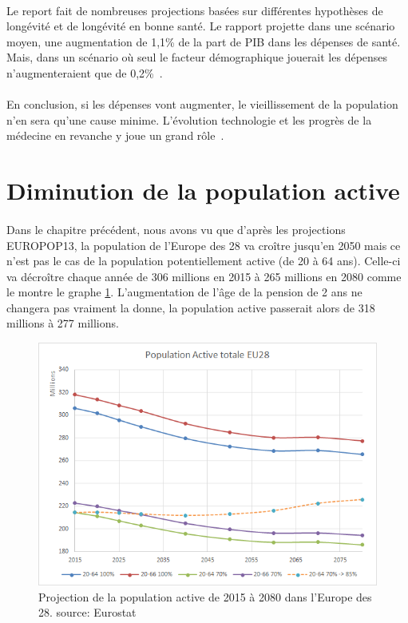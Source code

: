 \paragraph{}Le report fait de nombreuses projections basées sur différentes hypothèses de longévité et de longévité en bonne santé.  Le rapport projette dans une scénario moyen, une augmentation de 1,1\% de la part de PIB dans les dépenses de santé. Mais, dans un scénario où seul le facteur démographique jouerait les dépenses n’augmenteraient que de 0,2\%~\citep[pp.18]{ageing}. 

\paragraph{}En conclusion, si les dépenses vont augmenter, le vieillissement de la population n’en sera qu’une cause minime. L’évolution technologie et les progrès de la médecine en revanche y joue un grand rôle~\citep[pp.120]{ageing}. 

\section{Diminution de la population active}
\paragraph{}Dans le chapitre précédent, nous avons vu que d’après les projections EUROPOP13, la population de l’Europe des 28 va croître jusqu’en 2050 mais ce n’est pas le cas de la population potentiellement active (de 20 à 64 ans). Celle-ci va décroître chaque année de 306 millions en 2015 à 265 millions en 2080 comme le montre le graphe \ref{active}. L’augmentation de l’âge de la pension de 2 ans ne changera pas vraiment la donne, la population active passerait alors de 318 millions à 277 millions. 

\begin{figure}[h!]
    \begin{center}
        \includegraphics[scale=0.7]{document/active.png}
        \caption{Projection de la population active de 2015 à 2080 dans l'Europe des 28. source: Eurostat~\citep{eurostat_europop13}}
        \label{active}
    \end{center}
\end{figure}

